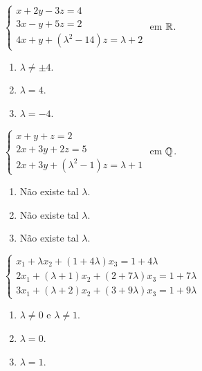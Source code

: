 \documentclass[12pt]{exam}
\begin{document}
\begin{exercicio}
  $
    \begin{cases}
      x + 2y - 3z = 4\\
      3x - y + 5z = 2\\
      4x + y + (\lambda^2 - 14)z = \lambda + 2
    \end{cases}
  $
  em $\mathbb{R}$.
  \begin{solucao}
    \begin{enumerate}[label={\alph*})]
      \item $\lambda \ne \pm 4$.
      \item $\lambda = 4$.
      \item $\lambda = -4$.
    \end{enumerate}
  \end{solucao}
\end{exercicio}

\begin{exercicio}
  $
    \begin{cases}
      x + y + z = 2\\
      2x + 3y + 2z = 5\\
      2x + 3y + (\lambda^2 - 1)z = \lambda + 1
    \end{cases}
  $
  em $\mathbb{Q}$.
  \begin{solucao}
    \begin{enumerate}[label={\alph*})]
      \item Não existe tal $\lambda$.
      \item Não existe tal $\lambda$.
      \item Não existe tal $\lambda$.
    \end{enumerate}
  \end{solucao}
\end{exercicio}

\begin{exercicio}
  $
    \begin{cases}
      x_1 + \lambda x_2 + (1 + 4\lambda )x_3 = 1 + 4\lambda \\
      2x_1 + (\lambda  + 1)x_2 + (2 + 7\lambda )x_3 = 1 + 7\lambda \\
      3x_1 + (\lambda  + 2)x_2 + (3 + 9\lambda )x_3 = 1 + 9\lambda
    \end{cases}
  $
  \begin{solucao}
    \begin{enumerate}[label={\alph*})]
      \item $\lambda \ne 0$ e $\lambda \ne 1$.
      \item $\lambda = 0$.
      \item $\lambda = 1$.
    \end{enumerate}
  \end{solucao}
\end{exercicio}
\end{document}
